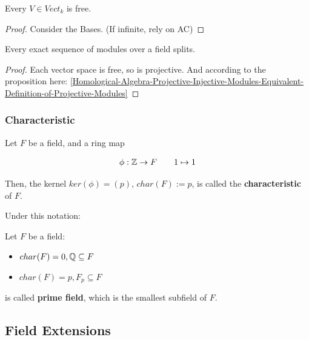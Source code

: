 \documentclass[Total.tex]{subfiles}
\begin{document}
				\begin{lemma}
					Every $V\in Vect_k$ is free.
				\end{lemma}
				
				\begin{proof}
					Consider the Bases. (If infinite, rely on AC)
				\end{proof}
				
				\begin{corollary}
					Every exact sequence of modules over a field splits. 
				\end{corollary}
				
				\begin{proof}
					Each vector space is free, so is projective. And according to the proposition here: \ref{Homological-Algebra-Projective-Injective-Modules-Equivalent-Definition-of-Projective-Modules}
				\end{proof}
			
			\subsubsection{Characteristic}
			
				\begin{Def}
					Let $F$ be a field, and a ring map 
					
					\begin{gather*}
						\phi:\mathbb{Z}\rightarrow F\qquad 1\mapsto 1
					\end{gather*}
					
					Then, the kernel $ker(\phi)=(p)$, $char(F):=p$, is called the \textbf{characteristic} of $F$.
				\end{Def}
				
				Under this notation:
				
				\begin{Def}
					Let $F$ be a field:
					
					\begin{itemize}
						\item $char(F)=0,\mathbb{Q}\subseteq F$
						\item $char(F)=p,F_p\subseteq F$
					\end{itemize}
					
					is called \textbf{prime field}, which is the smallest subfield of $F$.
				\end{Def}
			
			\subsection{Field Extensions}
			
\end{document}
